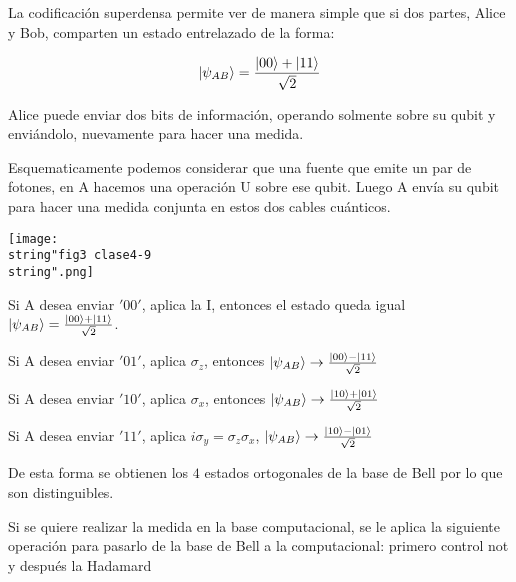 La codificación superdensa permite ver de manera simple que si dos partes, Alice y Bob,
comparten un estado entrelazado de la forma: 

\[
\KET{\psi_{AB}}=\frac{\KET{00}+\KET{11}}{\sqrt{2}}
\]

Alice puede enviar dos bits de información, operando solmente sobre su qubit y enviándolo,
nuevamente para hacer una medida. 

Esquematicamente podemos considerar que una fuente que emite un par de fotones,
en A hacemos una operación U sobre ese qubit. Luego A envía su qubit para hacer
una medida conjunta en estos dos cables cuánticos.

\begin{center}
\texttt{[image: \\string"fig3 clase4-9\\string".png]}
\par\end{center}

Si A desea enviar $'00'$,  aplica la I, entonces el estado queda igual $\KET{\psi_{AB}}=\frac{\KET{00}+\KET{11}}{\sqrt{2}}$. 

Si A desea enviar $'01'$, aplica $\sigma_{z}$, entonces $\KET{\psi_{AB}}\rightarrow\frac{\KET{00}-\KET{11}}{\sqrt{2}}$

Si A desea enviar $'10'$, aplica $\sigma_{x}$, entonces $\KET{\psi_{AB}}\rightarrow\frac{\KET{10}+\KET{01}}{\sqrt{2}}$

Si A desea enviar $'11'$, aplica $i \sigma_{y}=\sigma_{z} \sigma_{x}$, $\KET{\psi_{AB}}\rightarrow\frac{\KET{10}-\KET{01}}{\sqrt{2}}$

De esta forma se obtienen los $4$ estados ortogonales de la base de Bell 
por lo que son distinguibles.




Si se quiere realizar la medida en la base computacional, se le aplica la 
siguiente operación para pasarlo de la base de Bell a la computacional: primero
control not y después la Hadamard 

